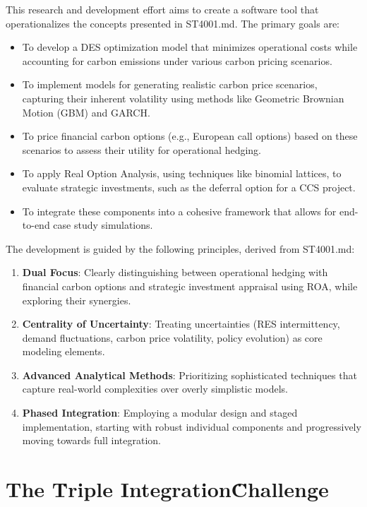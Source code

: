 This research and development effort aims to create a software tool that operationalizes the concepts presented in ST4001.md. The primary goals are:
\begin{itemize}
    \item To develop a DES optimization model that minimizes operational costs while accounting for carbon emissions under various carbon pricing scenarios.
    \item To implement models for generating realistic carbon price scenarios, capturing their inherent volatility using methods like Geometric Brownian Motion (GBM) and GARCH.
    \item To price financial carbon options (e.g., European call options) based on these scenarios to assess their utility for operational hedging.
    \item To apply Real Option Analysis, using techniques like binomial lattices, to evaluate strategic investments, such as the deferral option for a CCS project.
    \item To integrate these components into a cohesive framework that allows for end-to-end case study simulations.
\end{itemize}

The development is guided by the following principles, derived from ST4001.md:
\begin{enumerate}
    \item \textbf{Dual Focus}: Clearly distinguishing between operational hedging with financial carbon options and strategic investment appraisal using ROA, while exploring their synergies.
    \item \textbf{Centrality of Uncertainty}: Treating uncertainties (RES intermittency, demand fluctuations, carbon price volatility, policy evolution) as core modeling elements.
    \item \textbf{Advanced Analytical Methods}: Prioritizing sophisticated techniques that capture real-world complexities over overly simplistic models.
    \item \textbf{Phased Integration}: Employing a modular design and staged implementation, starting with robust individual components and progressively moving towards full integration.
\end{enumerate}

\section{The \"Triple Integration\" Challenge}

